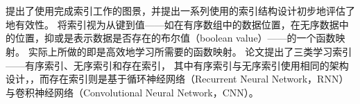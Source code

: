 


\section{\li}

{\li}提出了使用{\model}完成索引工作的图景，并提出一系列使用{\model}的索引结构设计初步地评估了{\li}地有效性。
{\li}将索引视为从键到值——如在有序数组中的数据位置，在无序数据中的位置，抑或是表示数据是否存在的布尔值（boolean value）——的一个函数映射。
{\li}实际上所做的即是高效地学习所需要的函数映射。
论文提出了三类学习索引{------}有序索引、无序索引和存在索引，
其中有序索引与无序索引使用相同的架构设计，{\rmi}，而存在索引则是基于循环神经网络（Recurrent Neural Network，RNN）与卷积神经网络（Convolutional Neural Network，CNN）。

